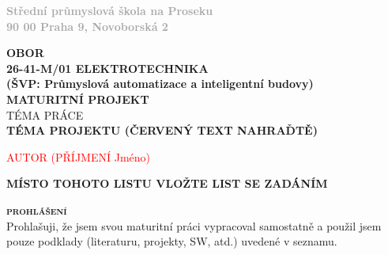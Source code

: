 \documentclass[12pt,a4paper]{article} %
\begin{document}
\begin{titlepage}
\begin{minipage}{0.3\textwidth}
\end{minipage}
\begin{adjustbox}{minipage=0.55\textwidth,left}
	\textbf{\textcolor{darkgray}{
	Střední průmyslová škola na Proseku\\
	90 00 Praha 9, Novoborská 2}}
\end{adjustbox}

\center

\textbf{\large OBOR}\\[0.5cm]
\textbf{\large	26-41-M/01 ELEKTROTECHNIKA\\
				(ŠVP: Průmyslová automatizace a inteligentní budovy)}\\[4.5cm]
\textbf{\LARGE MATURITNÍ PROJEKT}\\[1.5cm]
\textsc{TÉMA PRÁCE}\\[1.5cm]
\textbf{\color{red} \huge \bfseries  TÉMA PROJEKTU (ČERVENÝ TEXT NAHRAĎTĚ)}

\vspace*{\fill}

\begin{minipage}{0.49\textwidth}
\begin{flushleft} \large
\the\year %
\end{flushleft}
\end{minipage}
\begin{minipage}{0.49\textwidth}
\begin{flushright}
\textcolor{red}{\large AUTOR (PŘÍJMENÍ Jméno)}
\end{flushright}
\end{minipage}

\end{titlepage}

\textbf{\color{red} \LARGE MÍSTO TOHOTO LISTU VLOŽTE LIST SE ZADÁNÍM}
\newpage

\textsc{\textbf{\fontsize{20pt}{0}\selectfont prohlášení}}\\

{Prohlašuji, že jsem svou maturitní práci vypracoval samostatně a použil jsem pouze podklady (literaturu, projekty, SW, atd.) uvedené v seznamu.
}\\
\end{document}
